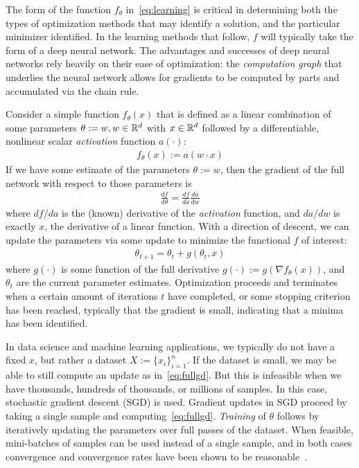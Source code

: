 The form of the function $f_\theta$ in~\eqref{eq:learning}
is critical in determining both
the types of optimization methods
that may identify a solution,
and the particular minimizer identified.
In the learning methods that follow,
$f$ will typically take the form of 
a deep neural network.
The advantages
and successes of deep neural networks
rely heavily on their ease of optimization:
the \textit{computation graph} that 
underlies the neural network
allows for gradients
to be computed by parts
and accumulated via the chain rule.

Consider a simple function $f_\theta(x)$
that is defined as a linear combination of 
some parameters $\theta:=w, w\in \mathbb{R}^d$ with $x\in \mathbb{R}^d$ followed by 
a differentiable, nonlinear scalar \textit{activation} function $a(\cdot)$:
\begin{align}
	f_\theta(x) := a(w\cdot x)
\end{align}
If we have some estimate of the parameters $\theta:=w$,
then the gradient of the full network with respect to those parameters is
\begin{align}
	\frac{df}{d\theta} = \frac{df}{da}\frac{da}{dw}
\end{align}
where $df/da$ is the (known) derivative of the \textit{activation} function,
and $da/dw$ is exactly $x$, the derivative of a linear function.
With a direction of descent,
we can update the parameters via some update to minimize the functional $f$ of interest:
\begin{align}\label{eq:fullgd}
	\theta_{t+1} = \theta_t + g(\theta_t,x)
\end{align}
where $g(\cdot)$ is some function of the full derivative $g(\cdot) := g(\nabla f_\theta(x))$,
and $\theta_t$ are the current parameter estimates.
Optimization proceeds and terminates when a certain amount
of iterations $t$ have completed,
or some stopping criterion has been reached,
typically that the gradient is small,
indicating that a minima has been identified.

In data science and machine learning applications,
we typically do not have a fixed $x$, but 
rather a dataset $X:=\{x_i\}_{i=1}^n$.
If the dataset is small,
we may be able to still compute an update as in~\eqref{eq:fullgd}.
But this is infeasible when we have thousands,
hundreds of thousands, or millions of samples.
In this case,
stochastic gradient descent (SGD) is used.
Gradient updates in SGD proceed
by taking a single sample and computing~\eqref{eq:fullgd}.
\textit{Training} of $\theta$
follows by iteratively updating the parameters
over full passes of the dataset.
When feasible, mini-batches of samples can
be used instead of a single sample,
and in both cases convergence and convergence
rates have been shown to be reasonable~\citep{hardt2016train}.

